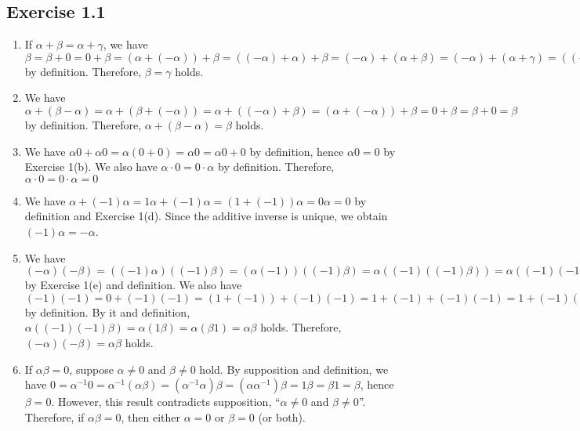 \documentclass{article}
\theoremstyle{thmstyleone}
\theoremstyle{thmstyletwo}
\theoremstyle{thmstylethree}
\begin{document}
\subsection{Exercise 1.1}
\begin{enumerate}[label = (\alph*), resume]
  \item If $\alpha + \beta = \alpha + \gamma$, 
    we have $\beta = \beta + 0 = 0 + \beta = (\alpha + (-\alpha)) + \beta = ((-\alpha) + \alpha) + \beta = (-\alpha) + (\alpha + \beta) = (-\alpha) + (\alpha + \gamma) = ((-\alpha) + \alpha) + \gamma = (\alpha + (-\alpha)) + \gamma = 0 + \gamma = \gamma + 0 = \gamma$ by definition.
    Therefore, $\beta = \gamma$ holds.

  \item We have $\alpha + (\beta - \alpha) = \alpha + (\beta + (-\alpha)) = \alpha + ((-\alpha) + \beta) = (\alpha + (-\alpha)) + \beta = 0 + \beta = \beta + 0 = \beta$ by definition.
    Therefore, $\alpha + (\beta - \alpha) = \beta$ holds.
    
  \item We have $\alpha0 + \alpha0 = \alpha(0 + 0) = \alpha0 = \alpha 0 + 0$ by definition,
    hence $\alpha0 = 0$ by Exercise 1(b).
    We also have $\alpha\cdot0 = 0\cdot\alpha$ by definition.
    Therefore, $\alpha\cdot0 = 0\cdot\alpha = 0$
    
  \item We have $\alpha + (-1)\alpha = 1\alpha + (-1)\alpha = (1 + (-1))\alpha = 0\alpha = 0$ by definition and Exercise 1(d).
      Since the additive inverse is unique,
      we obtain $(-1)\alpha = -\alpha$.
    
  \item We have $(-\alpha)(-\beta) = ((-1)\alpha)((-1)\beta) = (\alpha(-1))((-1)\beta) = \alpha((-1)((-1)\beta)) = \alpha((-1)(-1)\beta)$ by Exercise 1(e) and definition.
    We also have $(-1)(-1) = 0 + (-1)(-1) = (1 + (-1)) + (-1)(-1) = 1 + (-1) + (-1)(-1) = 1 + (-1)((-1) + 1) = 1 + (-1)(1 + (-1)) = 1 + (-1)0 = 1 + 0 = 1$ by definition.
    By it and definition, $\alpha((-1)(-1)\beta) = \alpha(1\beta) = \alpha(\beta1) = \alpha\beta$ holds.
    Therefore, $(-\alpha)(-\beta) = \alpha\beta$ holds.
    
  \item\label{it:ex1.1.g}
    If $\alpha\beta = 0$,
    suppose $\alpha \neq 0$ and $\beta \neq 0$ hold.
    By supposition and definition, we have $0 = \alpha^{-1}0 = \alpha^{-1}(\alpha\beta) = (\alpha^{-1}\alpha)\beta = (\alpha\alpha^{-1})\beta = 1\beta = \beta1 = \beta$,
    hence $\beta = 0$.
    However, this result contradicts supposition, ``$\alpha \neq 0$ and $\beta \neq 0$''.
    Therefore, if $\alpha\beta = 0$, then either $\alpha = 0$ or $\beta = 0$ (or both).
\end{enumerate}
\end{document}
